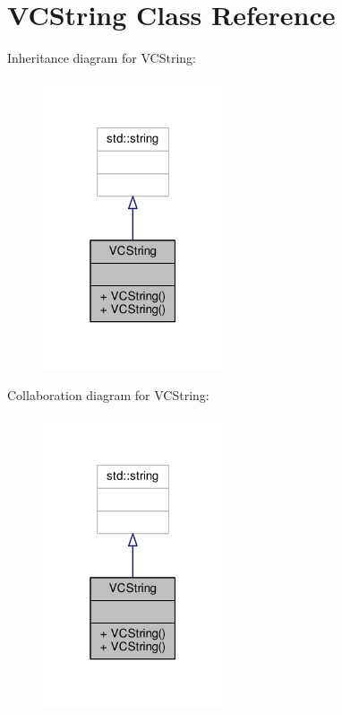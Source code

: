 \hypertarget{classVCString}{}\section{V\+C\+String Class Reference}
\label{classVCString}


Inheritance diagram for V\+C\+String\+:
\nopagebreak
\begin{figure}[H]
\begin{center}
\leavevmode
\includegraphics[width=151pt]{d6/de4/classVCString__inherit__graph}
\end{center}
\end{figure}


Collaboration diagram for V\+C\+String\+:
\nopagebreak
\begin{figure}[H]
\begin{center}
\leavevmode
\includegraphics[width=151pt]{de/df8/classVCString__coll__graph}
\end{center}
\end{figure}
